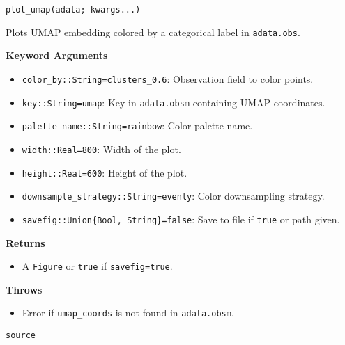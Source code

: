 \documentclass[oneside]{memoir}
\begin{document}
\begin{adjustwidth}{2em}{0pt}


\begin{verbatim}
plot_umap(adata; kwargs...)
\end{verbatim}

Plots UMAP embedding colored by a categorical label in \texttt{adata.obs}.

\textbf{Keyword Arguments}

\begin{itemize}
\item \texttt{color\_by::String={\textquotedbl}clusters\_0.6{\textquotedbl}}: Observation field to color points.


\item \texttt{key::String={\textquotedbl}umap{\textquotedbl}}: Key in \texttt{adata.obsm} containing UMAP coordinates.


\item \texttt{palette\_name::String={\textquotedbl}rainbow{\textquotedbl}}: Color palette name.


\item \texttt{width::Real=800}: Width of the plot.


\item \texttt{height::Real=600}: Height of the plot.


\item \texttt{downsample\_strategy::String={\textquotedbl}evenly{\textquotedbl}}: Color downsampling strategy.


\item \texttt{savefig::Union\{Bool, String\}=false}: Save to file if \texttt{true} or path given.

\end{itemize}
\textbf{Returns}

\begin{itemize}
\item A \texttt{Figure} or \texttt{true} if \texttt{savefig=true}.

\end{itemize}
\textbf{Throws}

\begin{itemize}
\item Error if \texttt{umap\_coords} is not found in \texttt{adata.obsm}.

\end{itemize}


\href{https://github.com/zehua0417/Juscan.jl/blob/393ad1b827b678ea98a738f92af658ee9ed9a403/src/plots/plots.jl#L341-L361}{\texttt{source}}


\end{adjustwidth}
\end{document}
